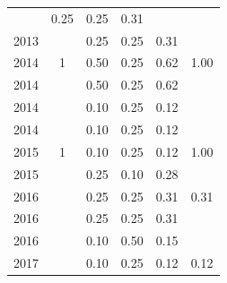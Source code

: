 \begin{table}[H]
\begin{tabular}{| l | c | c | c | c | c |}
          &
          0.25
          &
          0.25
          &
          0.31
          &
          \\
            2013
          &
          
          &
          0.25
          &
          0.25
          &
          0.31
          &
          \\
\hline
            2014
          &
          1
          &
          0.50
          &
          0.25
          &
          0.62
          &
            {\color{blue} 1.00}
          \\
            2014
          &
          
          &
          0.50
          &
          0.25
          &
          0.62
          &
          \\
            2014
          &
          
          &
          0.10
          &
          0.25
          &
          0.12
          &
          \\
            2014
          &
          
          &
          0.10
          &
          0.25
          &
          0.12
          &
          \\
\hline
            2015
          &
          1
          &
          0.10
          &
          0.25
          &
          0.12
          &
            {\color{blue} 1.00}
          \\
            2015
          &
          
          &
          0.25
          &
          0.10
          &
          0.28
          &
          \\
\hline
            2016
          &
          
          &
          0.25
          &
          0.25
          &
          0.31
          &
            {\color{red} 0.31}
          \\
            2016
          &
          
          &
          0.25
          &
          0.25
          &
          0.31
          &
          \\
            2016
          &
          
          &
          0.10
          &
          0.50
          &
          0.15
          &
          \\
\hline
            2017
          &
          
          &
          0.10
          &
          0.25
          &
          0.12
          &
            {\color{red} 0.12}
          \\
\hline
\end{tabular}
\end{table}

